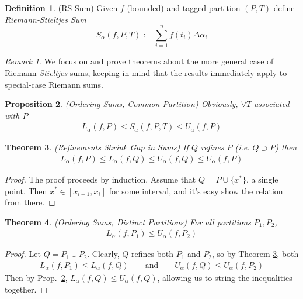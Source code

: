 \documentclass[12pt]{article}
\numberwithin{equation}{section} %
\theoremstyle{plain}
\newtheorem{thm}{Theorem}[section]
\newtheorem{prop}[thm]{Proposition}
\theoremstyle{definition}
\newtheorem{defn}[thm]{Definition}
\theoremstyle{remark}
\newtheorem*{rmk}{Remark}
\begin{document}
\begin{defn}(RS Sum)
\label{RSS}
Given $f$ (bounded) and tagged partition $(P,T)$ define
\emph{Riemann-Stieltjes Sum}
    \begin{equation}
        S_\alpha(f,P,T) := \sum^n_{i=1} f(t_i) \Delta \alpha_i
    \end{equation}
\end{defn}

\begin{rmk}
We focus on and prove theorems about
the more general case of Riemann-\emph{Stieltjes} sums, keeping in mind
that the results immediately apply to special-case Riemann sums.
\end{rmk}


\begin{prop}\emph{(Ordering Sums, Common Partition)}
\label{sumineqP}
Obviously, $\forall T$ associated with $P$
\begin{align*}
  L_\alpha(f,P) \leq S_\alpha(f,P,T) \leq U_\alpha(f,P)
\end{align*}
\end{prop}

\begin{thm}\emph{(Refinements Shrink Gap in Sums)}
\label{sumineq}
If $Q$ refines $P$ (i.e. $Q\supset P$) then
\begin{align*}
  L_\alpha(f,P) \leq L_\alpha(f,Q) \leq U_\alpha(f,Q) \leq U_\alpha(f,P)
\end{align*}
\end{thm}
\begin{proof}
The proof proceeds by induction. Assume that $Q = P \cup \{x^*\}$, a
single point. Then $x^*\in [x_{i-1}, x_i]$ for some interval, and it's
easy show the relation from there.
\end{proof}

\begin{thm}\emph{(Ordering Sums, Distinct Partitions)}
\label{pineq}
For all partitions $P_1, P_2$,
\begin{align*}
  L_\alpha(f,P_1) \leq U_\alpha(f,P_2)
\end{align*}
\end{thm}
\begin{proof}
Let $Q = P_1 \cup P_2$.  Clearly, $Q$ refines both $P_1$ and $P_2$, so
by Theorem \ref{sumineq}, both
\begin{align*}
  L_\alpha(f,P_1) \leq L_\alpha(f,Q)
  \qquad\text{and}\qquad
  U_\alpha(f,Q) \leq U_\alpha(f,P_2)
\end{align*}
Then by Prop.~\ref{sumineqP},
$L_\alpha(f,Q) \leq U_\alpha(f,Q)$, allowing us to string the
inequalities together.
\end{proof}
\end{document}
